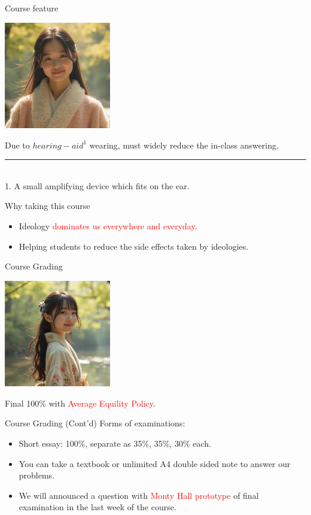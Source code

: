 \documentclass{beamer}
\begin{document}
\begin{frame}{Course feature}
\begin{center}
\includegraphics[width=0.35\textwidth]{feature.png}
\end{center}
\begin{center}
Due to $hearing-aid^{1}$ wearing, must widely reduce the in-class answering.
\end{center}
\vspace{1em}
\rule{0.35\textwidth}{0.5pt} \\
\scriptsize 1. A small amplifying device which fits on the ear.
\end{frame}
\begin{frame}{Why taking this course}
\begin{itemize}
\item Ideology \textcolor{red}{dominates us everywhere and everyday}.
\item Helping students to reduce the side effects taken by ideologies.
\end{itemize}
\end{frame}
\begin{frame}{Course Grading}
\begin{center}
\includegraphics[width=0.35\textwidth]{examination.png}
\end{center}
\begin{center}
Final 100\% with \textcolor{red}{Average Equility Policy}.
\end{center}
\end{frame}
\begin{frame}{Course Grading (Cont'd)}
Forms of examinations:
\begin{itemize}
\item Short essay: 100\%, separate as 35\%, 35\%, 30\% each.
\item You can take a textbook or unlimited A4 double sided note to answer our problems.
\item We will announced a question with \textcolor{red}{Monty Hall prototype} of final examination in the last week of the course.
\end{itemize}
\end{frame}
\end{document}

